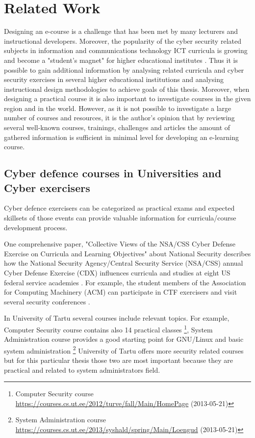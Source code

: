\section{Related Work}
\label{Related Work}
Designing an e-course is a challenge that has been met by many lecturers and instructional developers. Moreover, the popularity of the cyber security related subjects in information and communications technology ICT curricula is growing and become a "student’s magnet" for higher educational institutes \citep{CyberIsHot}. Thus it is possible to gain additional information by analysing related curricula and cyber security exercises  in several higher educational institutions and analysing instructional design methodologies to achieve goals of this thesis. Moreover, when designing a practical course it is also important to investigate courses in the given region and in the world. However, as it is not possible to investigate a large number of courses and resources, it is the author’s opinion that by reviewing several well-known courses, trainings, challenges and articles the amount of gathered information is sufficient in minimal level for developing an e-learning course.


\subsection{Cyber defence courses in Universities and Cyber exercisers}
Cyber defence exercisers can be categorized as practical exams and  expected skillsets of those events  can provide valuable information for curricula/course development process.

One comprehensive paper, "Collective Views of the NSA/CSS Cyber Defense Exercise
on Curricula and Learning Objectives" about National Security describes how the National Security
Agency/Central Security Service (NSA/CSS) annual Cyber Defense Exercise (\gls{CDX}) influences curricula and studies at eight US federal service academies \citep{adams_CDX_curricula}. For example, the student members of the Association for Computing Machinery (ACM) can participate in \gls{CTF} exercisers and  visit several security conferences \citep{adams_CDX_curricula}.

In University of Tartu several courses include relevant topics. For example, Computer Security course  contains also 14 practical classes \footnote{Computer Security course   \url{https://courses.cs.ut.ee/2012/turve/fall/Main/HomePage} (2013-05-21)}, System Administration course  provides a good starting point for GNU/Linux and basic system administration \footnote{ System Administration course  \url{https://courses.cs.ut.ee/2013/syshald/spring/Main/Loengud} (2013-05-21)}
University of Tartu offers more security related courses but for this particular thesis those two are most important because they are practical and related to system administrators field.

